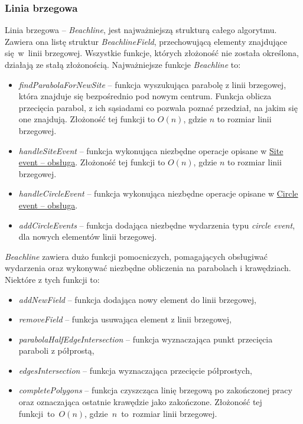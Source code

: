 \documentclass[declaration,shortabstract, inz]{iithesis}
\theoremstyle{definition} \newtheorem{definition}{Definicja}[]
\theoremstyle{plain} \newtheorem{remark}[definition]{Obserwacja}
\theoremstyle{plain} \newtheorem{theorem}[definition]{Twierdzenie}
\theoremstyle{plain} \newtheorem{example}{Przykład}[definition]
\theoremstyle{plain} \newtheorem{lemma}[definition]{Lemat}
\begin{document}
\subsubsection{Linia brzegowa}
Linia brzegowa -- \textit{Beachline}, jest najważniejszą strukturą całego algorytmu. Zawiera ona listę struktur \textit{BeachlineField}, przechowującą elementy znajdujące się~w~linii brzegowej. Wszystkie funkcje, których złożoność nie została określona, działają ze stałą złożonością. Najważniejsze funkcje \textit{Beachline} to:

\begin{itemize}
\item \textit{findParabolaForNewSite} -- funkcja wyszukująca parabolę z linii brzegowej, która znajduje się bezpośrednio pod nowym centrum. Funkcja oblicza przecięcia parabol, z ich sąsiadami co pozwala poznać przedział, na jakim się one znajdują. Złożoność tej funkcji to $O(n)$, gdzie $n$ to rozmiar linii brzegowej.

\item \textit{handleSiteEvent} -- funkcja wykonująca niezbędne operacje opisane w \hyperref[sec:site]{Site event -- obsługa}. Złożoność tej funkcji to $O(n)$, gdzie $n$ to rozmiar linii brzegowej.

\item \textit{handleCircleEvent} -- funkcja wykonująca niezbędne operacje opisane w \hyperref[sec:circle]{Circle event -- obsługa}.

\item \textit{addCircleEvents} -- funkcja dodająca niezbędne wydarzenia typu \textit{circle event}, dla nowych elementów linii brzegowej.
\end{itemize}

\textit{Beachline} zawiera dużo funkcji pomocniczych, pomagających obsługiwać wydarzenia oraz wykonywać niezbędne obliczenia na parabolach i krawędziach. Niektóre z tych funkcji to:

\begin{itemize}
\item \textit{addNewField} -- funkcja dodająca nowy element do linii brzegowej,
\item \textit{removeField} -- funkcja usuwająca element z linii brzegowej,
\item \textit{parabolaHalfEdgeIntersection} -- funkcja wyznaczająca punkt przecięcia paraboli z półprostą,
\item \textit{edgesIntersection} -- funkcja wyznaczająca przecięcie półprostych,
\item \textit{completePolygons} -- funkcja czyszcząca linię brzegową po zakończonej pracy oraz oznaczająca ostatnie krawędzie jako zakończone. Złożoność tej funkcji~to~$O(n)$, gdzie~$n$~to~rozmiar linii brzegowej.
\end{itemize}
\end{document}
